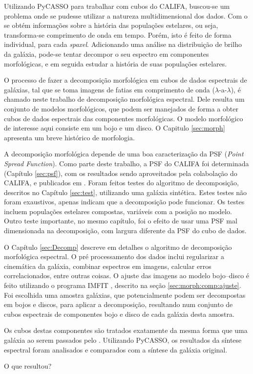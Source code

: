 Utilizando PyCASSO para trabalhar com cubos do CALIFA, buscou-se um problema
onde se pudesse utilizar a natureza multidimensional dos dados. Com o \starlight
se obtém informações sobre a história das populações estelares, ou seja,
transforma-se comprimento de onda em tempo. Porém, isto é feito de forma
individual, para cada {\em spaxel}. Adicionando uma análise na distribuição de
brilho da galáxia, pode-se tentar decompor o seu espectro em componentes
morfológicas, e em seguida estudar a história de suas populações estelares.

O processo de fazer a decomposição morfológica em cubos de dados espectrais de
galáxias, tal que se toma imagens de fatias em comprimento de onda
($\lambda$-a-$\lambda$), é chamado neste trabalho de decomposição morfológica
espectral. Dele resulta um conjunto de modelos morfológicos, que podem ser
manejados de forma a obter cubos de dados espectrais das componentes
morfológicas. O modelo morfológico de interesse aqui consiste em um bojo e um
disco. O Capitulo \ref{sec:morph} apresenta um breve histórico de morfologia.

A decomposição morfológica depende de uma boa caracterização da PSF ({\em Point
Spread Function}). Como parte deste trabalho, a PSF do CALIFA foi determinada
(Capítulo \ref{sec:psf}), com os resultados sendo aproveitados pela colabolação
do CALIFA, e publicados em \citet{GarciaBenito2015}. Foram feitos testes do
algoritmo de decomposição, descritos no Capítulo \ref{sec:test}, utilizando uma
galáxia sintética. Estes testes não foram exaustivos, apenas indicam que a
decomposição pode funcionar. Os testes incluem populações estelares compostas,
variáveis com a posição no modelo. Outro teste importante, no mesmo capítulo,
foi o efeito de usar uma PSF mal dimensionada na decomposição, com largura
diferente da PSF do cubo de dados.

O Capítulo \ref{sec:Decomp} descreve em detalhes o algoritmo de decomposição
morfológica espectral. O pré processamento dos dados inclui regularizar a
cinemática da galáxia, combinar espectros em imagens, calcular erros
correlacionados, entre outras coisas. O ajuste das imagens ao modelo bojo--disco
é feito utilizando o programa IMFIT \citep{Erwin2015}, descrito na seção
\ref{sec:morph:comp:ajuste}. Foi escolhida uma amostra galáxias, que
potencialmente podem ser decompostas em bojos e discos, para aplicar a
decomposição, resultando num conjunto de cubos espectrais de componentes bojo e
disco de cada galáxia desta amostra.

Os cubos destas componentes são tratados exatamente da mesma forma que uma
galáxia ao serem passados pelo \starlight. Utilizando PyCASSO, os
resultados da síntese espectral foram analisados e comparados com a síntese da
galáxia original.

\TODO O que resultou?


